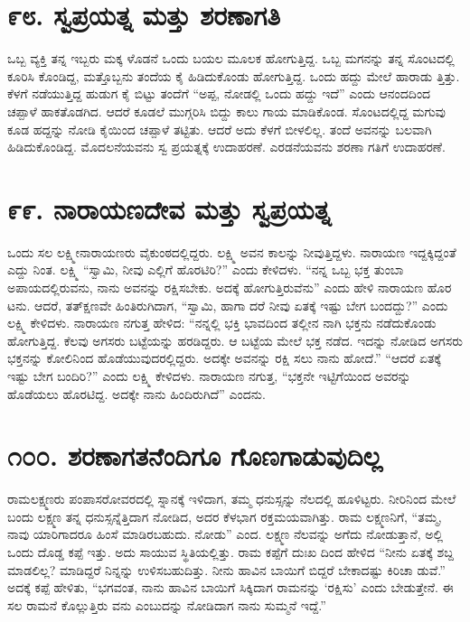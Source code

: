 \section{\num{೯೮. } ಸ್ವಪ್ರಯತ್ನ ಮತ್ತು ಶರಣಾಗತಿ}

ಒಬ್ಬ ವ್ಯಕ್ತಿ ತನ್ನ ಇಬ್ಬರು ಮಕ್ಕ ಳೊಡನೆ ಒಂದು ಬಯಲ ಮೂಲಕ ಹೋಗುತ್ತಿದ್ದ. ಒಬ್ಬ ಮಗನನ್ನು ತನ್ನ ಸೊಂಟದಲ್ಲಿ ಕೂರಿಸಿ ಕೊಂಡಿದ್ದ, ಮತ್ತೊಬ್ಬನು ತಂದೆಯ ಕೈ ಹಿಡಿದುಕೊಂಡು ಹೋಗುತ್ತಿದ್ದ. ಒಂದು ಹದ್ದು ಮೇಲೆ ಹಾರಾಡು ತ್ತಿತ್ತು. ಕೆಳಗೆ ನಡೆಯುತ್ತಿದ್ದ ಹುಡುಗ ಕೈ ಬಿಟ್ಟು ತಂದೆಗೆ “ಅಪ್ಪ, ನೋಡಲ್ಲಿ ಒಂದು ಹದ್ದು ಇದೆ” ಎಂದು ಆನಂದದಿಂದ ಚಪ್ಪಾಳೆ ಹಾಕತೊಡಗಿದ. ಆದರೆ ಕೂಡಲೆ ಮುಗ್ಗರಿಸಿ ಬಿದ್ದು ಕಾಲು ಗಾಯ ಮಾಡಿಕೊಂಡ. ಸೊಂಟದಲ್ಲಿದ್ದ ಮಗುವು ಕೂಡ ಹದ್ದನ್ನು ನೋಡಿ ಕೈಯಿಂದ ಚಪ್ಪಾಳೆ ತಟ್ಟಿತು. ಆದರೆ ಅದು ಕೆಳಗೆ ಬೀಳಲಿಲ್ಲ. ತಂದೆ ಅವನನ್ನು ಬಲವಾಗಿ ಹಿಡಿದುಕೊಂಡಿದ್ದ. ಮೊದಲನೆಯವನು ಸ್ವ ಪ್ರಯತ್ನಕ್ಕೆ ಉದಾಹರಣೆ. ಎರಡನೆಯವನು ಶರಣಾ ಗತಿಗೆ ಉದಾಹರಣೆ.


\section{\num{೯೯. } ನಾರಾಯಣದೇವ ಮತ್ತು ಸ್ವಪ್ರಯತ್ನ}

ಒಂದು ಸಲ ಲಕ್ಷ್ಮೀನಾರಾಯಣರು ವೈಕುಂಠದಲ್ಲಿದ್ದರು. ಲಕ್ಷ್ಮಿ ಅವನ ಕಾಲನ್ನು ನೀವುತ್ತಿದ್ದಳು. ನಾರಾಯಣ ಇದ್ದಕ್ಕಿದ್ದಂತೆ ಎದ್ದು ನಿಂತ. ಲಕ್ಷ್ಮಿ “ಸ್ವಾಮಿ, ನೀವು ಎಲ್ಲಿಗೆ ಹೊರಟಿರಿ?” ಎಂದು ಕೇಳಿದಳು. “ನನ್ನ ಒಬ್ಬ ಭಕ್ತ ತುಂಬಾ ಅಪಾಯದಲ್ಲಿರುವನು, ನಾನು ಅವನನ್ನು ರಕ್ಷಿಸಬೇಕು. ಅದಕ್ಕೆ ಹೋಗುತ್ತಿರುವೆನು” ಎಂದು ಹೇಳಿ ನಾರಾಯಣ ಹೊರ ಟನು. ಆದರೆ, ತತ್​ಕ್ಷಣವೇ ಹಿಂತಿರುಗಿದಾಗ, “ಸ್ವಾಮಿ, ಹಾಗಾ ದರೆ ನೀವು ಏತಕ್ಕೆ ಇಷ್ಟು ಬೇಗ ಬಂದದ್ದು?” ಎಂದು ಲಕ್ಷ್ಮಿ ಕೇಳಿದಳು. ನಾರಾಯಣ ನಗುತ್ತ ಹೇಳಿದ: “ನನ್ನಲ್ಲಿ ಭಕ್ತಿ ಭಾವದಿಂದ ತಲ್ಲೀನ ನಾಗಿ ಭಕ್ತನು ನಡೆದುಕೊಂಡು ಹೋಗುತ್ತಿದ್ದ. ಕೆಲವು ಅಗಸರು ಬಟ್ಟೆಯನ್ನು ಹರಡಿದ್ದರು. ಆ ಬಟ್ಟೆಯ ಮೇಲೆ ಭಕ್ತ ನಡೆದ. ಇದನ್ನು ನೋಡಿದ ಅಗಸರು ಭಕ್ತನನ್ನು ಕೋಲಿನಿಂದ ಹೊಡೆಯುವುದರಲ್ಲಿದ್ದರು. ಅದಕ್ಕೇ ಅವನನ್ನು ರಕ್ಷಿ ಸಲು ನಾನು ಹೋದೆ.” “ಆದರೆ ಏತಕ್ಕೆ ಇಷ್ಟು ಬೇಗ ಬಂದಿರಿ?” ಎಂದು ಲಕ್ಷ್ಮಿ ಕೇಳಿದಳು. ನಾರಾಯಣ ನಗುತ್ತ, “ಭಕ್ತನೇ ಇಟ್ಟಿಗೆಯಿಂದ ಅವರನ್ನು ಹೊಡೆಯಲು ಹೊರಟಿದ್ದ. ಅದಕ್ಕೇ ನಾನು ಹಿಂದಿರುಗಿದೆ” ಎಂದನು.


\section{\num{೧೦೦. } ಶರಣಾಗತನೆಂದಿಗೂ ಗೊಣಗಾಡುವುದಿಲ್ಲ}

ರಾಮಲಕ್ಷ್ಮಣರು ಪಂಪಾಸರೋವರದಲ್ಲಿ ಸ್ನಾನಕ್ಕೆ ಇಳಿದಾಗ, ತಮ್ಮ ಧನುಸ್ಸನ್ನು ನೆಲದಲ್ಲಿ ಹೂಳಿಟ್ಟರು. ನೀರಿನಿಂದ ಮೇಲೆ ಬಂದು ಲಕ್ಷ್ಮಣ ತನ್ನ ಧನುಸ್ಸನ್ನೆತ್ತಿದಾಗ ನೋಡಿದ, ಅದರ ಕೆಳಭಾಗ ರಕ್ತಮಯವಾಗಿತ್ತು. ರಾಮ ಲಕ್ಷ್ಮಣನಿಗೆ, “ತಮ್ಮ, ನಾವು ಯಾರಿಗಾದರೂ ಹಿಂಸೆ ಮಾಡಿರಬಹುದು. ನೋಡು” ಎಂದ. ಲಕ್ಷ್ಮಣ ನೆಲವನ್ನು ಅಗೆದು ನೋಡುತ್ತಾನೆ, ಅಲ್ಲಿ ಒಂದು ದೊಡ್ಡ ಕಪ್ಪೆ ಇತ್ತು. ಅದು ಸಾಯುವ ಸ್ಥಿತಿಯಲ್ಲಿತ್ತು. ರಾಮ ಕಪ್ಪೆಗೆ ದುಃಖ ದಿಂದ ಹೇಳಿದ “ನೀನು ಏತಕ್ಕೆ ಶಬ್ದ ಮಾಡಲಿಲ್ಲ? ಮಾಡಿದ್ದರೆ ನಿನ್ನನ್ನು ಉಳಿಸಬಹುದಿತ್ತು. ನೀನು ಹಾವಿನ ಬಾಯಿಗೆ ಬಿದ್ದರೆ ಬೇಕಾದಷ್ಟು ಕಿರಿಚಾ ಡುವೆ.” ಅದಕ್ಕೆ ಕಪ್ಪೆ ಹೇಳಿತು, “ಭಗವಂತ, ನಾನು ಹಾವಿನ ಬಾಯಿಗೆ ಸಿಕ್ಕಿದಾಗ ರಾಮನನ್ನು ‘ರಕ್ಷಿಸು’ ಎಂದು ಬೇಡುತ್ತೇನೆ. ಈ ಸಲ ರಾಮನೆ ಕೊಲ್ಲುತ್ತಿರು ವನು ಎಂಬುದನ್ನು ನೋಡಿದಾಗ ನಾನು ಸುಮ್ಮನೆ ಇದ್ದೆ.”

